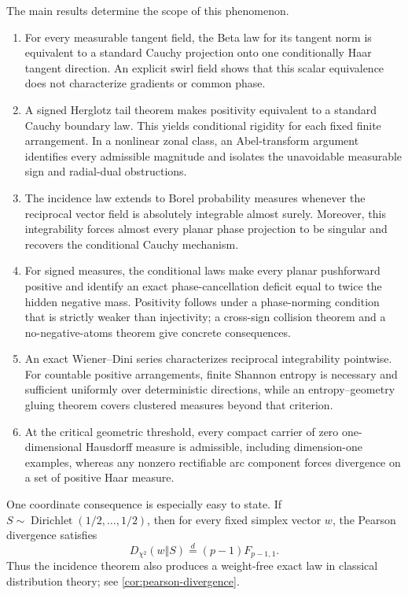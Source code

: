 \documentclass[11pt]{article}
\numberwithin{equation}{section}
\theoremstyle{thmstyleone}%
\theoremstyle{thmstyletwo}%
\let\cref\autoref
\newcommand{\Dir}{\operatorname{Dirichlet}}
\begin{document}
The main results determine the scope of this phenomenon.

\begin{enumerate}[label=\textup{(\roman*)}]
\item For every measurable tangent field, the Beta law for its tangent norm
  is equivalent to a standard Cauchy projection onto one conditionally Haar
  tangent direction.  An explicit swirl field shows that this scalar
  equivalence does not characterize gradients or common phase.
\item A signed Herglotz tail theorem makes positivity equivalent to a
  standard Cauchy boundary law.  This yields conditional rigidity for each
  fixed finite arrangement.  In a nonlinear zonal class, an Abel-transform
  argument identifies every admissible magnitude and isolates the
  unavoidable measurable sign and radial-dual obstructions.
\item The incidence law extends to Borel probability measures whenever the
  reciprocal vector field is absolutely integrable almost surely.
  Moreover, this integrability forces almost every planar phase projection
  to be singular and recovers the conditional Cauchy mechanism.
\item For signed measures, the conditional laws make every planar
  pushforward positive and identify an exact phase-cancellation deficit equal
  to twice the hidden negative mass.  Positivity follows under a phase-norming
  condition that is strictly weaker than injectivity; a cross-sign collision
  theorem and a no-negative-atoms theorem give concrete consequences.
\item An exact Wiener--Dini series characterizes reciprocal integrability
  pointwise.  For countable positive arrangements, finite Shannon entropy is
  necessary and sufficient uniformly over deterministic directions, while
  an entropy--geometry gluing theorem covers clustered measures beyond that
  criterion.
\item At the critical geometric threshold, every compact carrier of zero
  one-dimensional Hausdorff measure is admissible, including
  dimension-one examples, whereas any nonzero rectifiable arc component
  forces divergence on a set of positive Haar measure.
\end{enumerate}

One coordinate consequence is especially easy to state.  If
\(S\sim\Dir(1/2,\ldots,1/2)\), then for every fixed simplex vector \(w\),
the Pearson divergence satisfies
\[
  D_{\chi^2}(w\Vert S)\overset d=(p-1)F_{p-1,1}.
\]
Thus the incidence theorem also produces a weight-free exact law in
classical distribution theory; see \cref{cor:pearson-divergence}.
\end{document}

